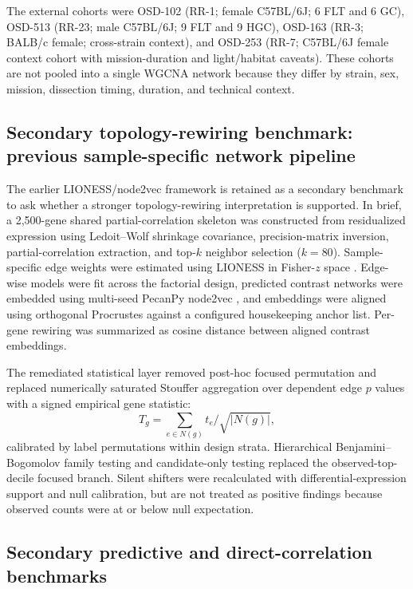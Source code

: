 \documentclass[11pt]{article}
\newcommand{\pkg}[1]{\textsf{#1}}
\begin{document}
The external cohorts were OSD-102 (RR-1; female C57BL/6J; 6 FLT and 6 GC), OSD-513 (RR-23; male C57BL/6J; 9 FLT and 9 HGC), OSD-163 (RR-3; BALB/c female; cross-strain context), and OSD-253 (RR-7; C57BL/6J female context cohort with mission-duration and light/habitat caveats). These cohorts are not pooled into a single WGCNA network because they differ by strain, sex, mission, dissection timing, duration, and technical context.

\subsection{Secondary topology-rewiring benchmark: previous sample-specific network pipeline}

The earlier LIONESS/node2vec framework is retained as a secondary benchmark to ask whether a stronger topology-rewiring interpretation is supported. In brief, a 2,500-gene shared partial-correlation skeleton was constructed from residualized expression using Ledoit--Wolf shrinkage covariance, precision-matrix inversion, partial-correlation extraction, and top-$k$ neighbor selection ($k=80$). Sample-specific edge weights were estimated using LIONESS in Fisher-$z$ space \citep{kuijjer2019estimating}. Edge-wise models were fit across the factorial design, predicted contrast networks were embedded using multi-seed \pkg{PecanPy} \pkg{node2vec} \citep{grover2016node2vec,liu2021pecanpy}, and embeddings were aligned using orthogonal Procrustes against a configured housekeeping anchor list. Per-gene rewiring was summarized as cosine distance between aligned contrast embeddings.

The remediated statistical layer removed post-hoc focused permutation and replaced numerically saturated Stouffer aggregation over dependent edge $p$ values with a signed empirical gene statistic:
\[
T_g = \sum_{e\in N(g)} t_e/\sqrt{|N(g)|},
\]
calibrated by label permutations within design strata. Hierarchical Benjamini--Bogomolov family testing and candidate-only testing replaced the observed-top-decile focused branch. Silent shifters were recalculated with differential-expression support and null calibration, but are not treated as positive findings because observed counts were at or below null expectation.

\subsection{Secondary predictive and direct-correlation benchmarks}
\end{document}
